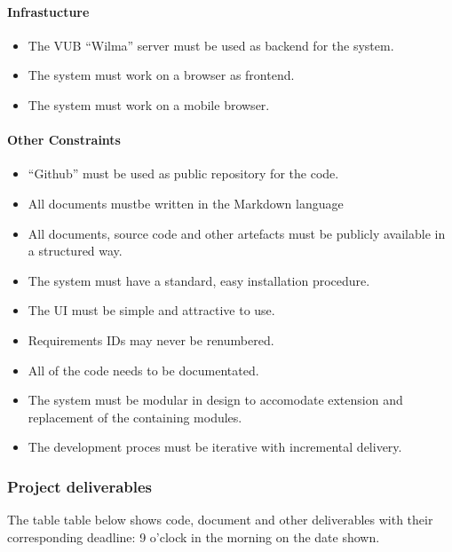 \documentclass[12pt]{article}
\begin{document}
\paragraph{Infrastucture}\label{infrastucture}

\begin{itemize}
\itemsep1pt\parskip0pt
\item
  The VUB ``Wilma'' server must be used as backend for
  the system.
\item
  The system must work on a browser as frontend.
\item
  The system must work on a mobile browser.
\end{itemize}

\paragraph{Other Constraints}\label{other-constraints}

\begin{itemize}
\itemsep1pt\parskip0pt
\item
  ``Github'' must be used as public repository for
  the code.
\item
  All documents mustbe written in the Markdown language
\item
  All documents, source code and other artefacts must be publicly
  available in a structured way.
\item
  The system must have a standard, easy installation procedure.
\item
  The UI must be simple and attractive to use.
\item
  Requirements IDs may never be renumbered.
\item
  All of the code needs to be documentated.
\item
  The system must be modular in design to accomodate extension and
  replacement of the containing modules.
\item
  The development proces must be iterative with incremental delivery.
\end{itemize}

\subsubsection{Project deliverables}\label{project-deliverables}

The table table below shows code, document and other deliverables with
their corresponding deadline: 9 o'clock in the morning on the date
shown.
\end{document}
